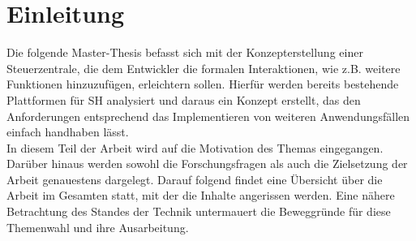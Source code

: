 \chapter{Einleitung}
\label{chap:Einleitung}
    Die folgende Master-Thesis befasst sich mit der Konzepterstellung einer Steuerzentrale, die 
    dem Entwickler die formalen Interaktionen, wie z.B. weitere Funktionen hinzuzufügen, erleichtern sollen. Hierfür werden
    bereits bestehende Plattformen für \acl{SH} analysiert und daraus ein Konzept erstellt, das den Anforderungen 
    entsprechend das Implementieren von weiteren Anwendungsfällen einfach handhaben lässt. 
    \\
    \linebreak
    In diesem Teil der Arbeit wird auf die Motivation des Themas eingegangen. Darüber hinaus 
    werden sowohl die Forschungsfragen als auch die Zielsetzung der Arbeit genauestens dargelegt. Darauf 
    folgend findet eine Übersicht über die Arbeit im Gesamten statt, mit der die Inhalte angerissen werden. 
    Eine nähere Betrachtung des Standes der Technik untermauert die Beweggründe für diese Themenwahl und 
    ihre Ausarbeitung. 

